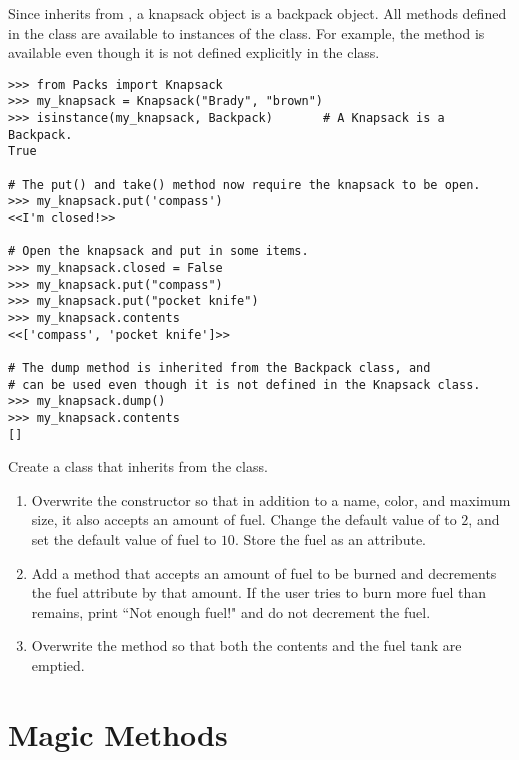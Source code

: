 Since  inherits from , a knapsack object is a backpack object.
All methods defined in the  class are available to instances of the  class.
For example, the  method is available even though it is not defined explicitly in the  class.

\begin{lstlisting}
>>> from Packs import Knapsack
>>> my_knapsack = Knapsack("Brady", "brown")
>>> isinstance(my_knapsack, Backpack)       # A Knapsack is a Backpack.
True

# The put() and take() method now require the knapsack to be open.
>>> my_knapsack.put('compass')
<<I'm closed!>>

# Open the knapsack and put in some items.
>>> my_knapsack.closed = False
>>> my_knapsack.put("compass")
>>> my_knapsack.put("pocket knife")
>>> my_knapsack.contents
<<['compass', 'pocket knife']>>

# The dump method is inherited from the Backpack class, and
# can be used even though it is not defined in the Knapsack class.
>>> my_knapsack.dump()
>>> my_knapsack.contents
[]
\end{lstlisting}

\begin{problem}
Create a  class that inherits from the  class.
\begin{enumerate}
\item Overwrite the constructor so that in addition to a name, color, and maximum size, it also accepts an amount of fuel.
Change the default value of  to $2$, and set the default value of fuel to $10$.
Store the fuel as an attribute.

\item Add a  method that accepts an amount of fuel to be burned and decrements the fuel attribute by that amount.
If the user tries to burn more fuel than remains, print ``Not enough fuel!" and do not decrement the fuel.

\item Overwrite the  method so that both the contents and the fuel tank are emptied.
\end{enumerate}
\end{problem}

\section*{Magic Methods} %

